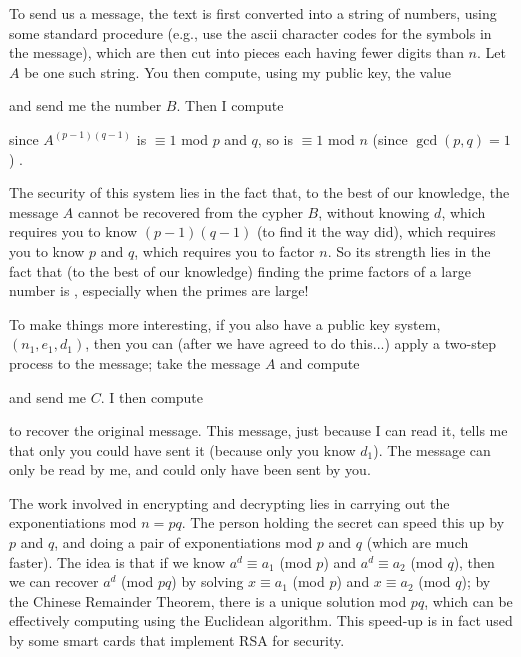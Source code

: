 To send us a message, the text is first converted into a string of numbers, using some
standard procedure (e.g., use the ascii character codes for the symbols in the message), 
which are then cut into pieces each having fewer digits than $n$. Let $A$ be one such string.
You then compute, using my public key, the value

\ssk


\ssk

\noindent and send me the number $B$. Then I compute

\ssk


\noindent since $A^{(p-1)(q-1)}$ is $\equiv 1$ mod $p$ and $q$, so is $\equiv 1$ mod $n$ (since $\gcd(p,q)=1$) .

\medskip

The security of this system lies in the fact that, to the best of our knowledge, the message $A$ cannot
be recovered from the cypher $B$, without knowing $d$, which requires you to know $(p-1)(q-1)$ (to find
it the way  did), which requires you to know $p$ and $q$, which requires you to factor $n$.
So its strength lies in the fact that (to the best of our knowledge) finding the prime factors of a large 
number is , especially when the primes are large! 

\msk

To make things more interesting, if you also have a public key system, $(n_1,e_1,d_1)$, then you can (after
we have agreed to do this...) apply a two-step process to the message; take the message $A$ and compute 

\ssk


\noindent and send me $C$. I then compute 

\ssk


\ssk

\noindent to recover the original message.  This message, just because I can read it, tells me
that only you could have sent it (because only you know $d_1$). The message can only be read by me, and 
could only have been sent by you.

\msk

The work involved in encrypting and decrypting lies in carrying out the exponentiations
mod $n=pq$. The person holding the secret can speed this up by 
$p$ and $q$, and doing a pair of exponentiations mod $p$ and $q$ (which are much faster).
The idea is that if we know $a^d\equiv a_1$ (mod $p$) and $a^d\equiv a_2$ (mod $q$),
then we can recover $a^d$ (mod $pq$) by solving $x\equiv a_1$ (mod $p$) and
$x\equiv a_2$ (mod $q$); by the Chinese Remainder Theorem, there is a unique
solution mod $pq$, which can be effectively computing using the
Euclidean algorithm. This speed-up is in fact used by some smart cards that implement
RSA for security.

